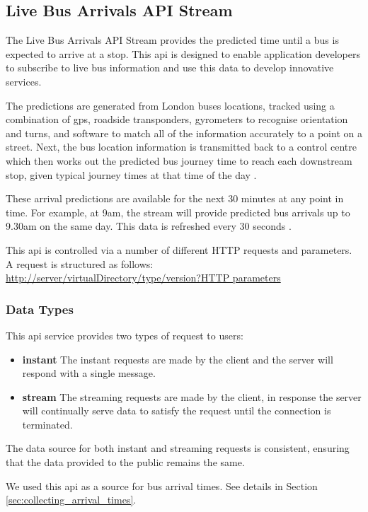 \subsection{Live Bus Arrivals API Stream}
\par The Live Bus Arrivals API Stream provides the predicted time until a bus is expected to arrive at a stop. This \acrshort{api} is designed to enable application developers to subscribe to live bus information and use this data to develop innovative services\cite{live_bus_api_documentation}.

\par The predictions are generated from London buses locations, tracked using a combination of \acrfull{gps}, roadside transponders, gyrometers to recognise orientation and turns, and software to match all of the information accurately to a point on a street. Next, the bus location information is transmitted back to a control centre which then works out the predicted bus journey time to reach each downstream stop, given typical journey times at that time of the day \cite{quora_generate_countdown}.

\par These arrival predictions are available for the next 30 minutes at any point in time. For example, at 9am, the stream will provide predicted bus arrivals up to 9.30am on the same day. This data is refreshed every 30 seconds \cite{live_bus_api_documentation}.

\par This \acrshort{api} is controlled via a number of different HTTP requests and parameters. A request is structured as follows: \\
\url{http://server/virtualDirectory/type/version?HTTP parameters}

\subsubsection{Data Types}

\par This \acrshort{api} service provides two types of request to users:

\begin{itemize}
  \item \textbf{instant} The instant requests are made by the client and the server will respond with a single message.
  \item \textbf{stream} The streaming requests are made by the client, in response the server will continually serve data to satisfy the request until the connection is terminated.
\end{itemize}

\par The data source for both instant and streaming requests is consistent, ensuring that the data provided to the public remains the same.

\par We used this \acrshort{api} as a source for bus arrival times. See details in Section \ref{sec:collecting_arrival_times}.


